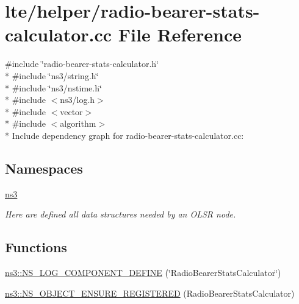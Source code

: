 \hypertarget{radio-bearer-stats-calculator_8cc}{}\section{lte/helper/radio-\/bearer-\/stats-\/calculator.cc File Reference}
\label{radio-bearer-stats-calculator_8cc}
{\ttfamily \#include \char`\"{}radio-\/bearer-\/stats-\/calculator.\+h\char`\"{}}\\*
{\ttfamily \#include \char`\"{}ns3/string.\+h\char`\"{}}\\*
{\ttfamily \#include \char`\"{}ns3/nstime.\+h\char`\"{}}\\*
{\ttfamily \#include $<$ns3/log.\+h$>$}\\*
{\ttfamily \#include $<$vector$>$}\\*
{\ttfamily \#include $<$algorithm$>$}\\*
Include dependency graph for radio-\/bearer-\/stats-\/calculator.cc\+:
\subsection*{Namespaces}
\begin{DoxyCompactItemize}
\item 
 \hyperlink{namespacens3}{ns3}
\begin{DoxyCompactList}\small\item\em Here are defined all data structures needed by an O\+L\+SR node. \end{DoxyCompactList}\end{DoxyCompactItemize}
\subsection*{Functions}
\begin{DoxyCompactItemize}
\item 
\hyperlink{namespacens3_a02b07c44e7e64eaab6e1847ce07dbbb3}{ns3\+::\+N\+S\+\_\+\+L\+O\+G\+\_\+\+C\+O\+M\+P\+O\+N\+E\+N\+T\+\_\+\+D\+E\+F\+I\+NE} (\char`\"{}Radio\+Bearer\+Stats\+Calculator\char`\"{})
\item 
\hyperlink{namespacens3_a773e1c63e4480cb286957111092db29a}{ns3\+::\+N\+S\+\_\+\+O\+B\+J\+E\+C\+T\+\_\+\+E\+N\+S\+U\+R\+E\+\_\+\+R\+E\+G\+I\+S\+T\+E\+R\+ED} (Radio\+Bearer\+Stats\+Calculator)
\end{DoxyCompactItemize}
